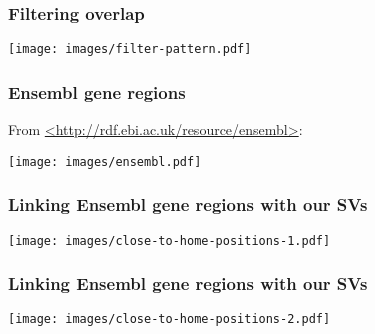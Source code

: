 \documentclass[11pt,aspectratio=169]{beamer} %
\begin{document}
\begin{frame}
  \frametitle{Filtering overlap}
  \begin{center}
    \texttt{[image: images/filter-pattern.pdf]}
  \end{center}
\end{frame}


\begin{frame}
  \frametitle{Ensembl gene regions}
  From \url{<http://rdf.ebi.ac.uk/resource/ensembl>}:
  \begin{center}
    \texttt{[image: images/ensembl.pdf]}
  \end{center}
\end{frame}

\begin{frame}
  \frametitle{Linking Ensembl gene regions with our SVs}
  \begin{center}
    \texttt{[image: images/close-to-home-positions-1.pdf]}
  \end{center}
\end{frame}

\begin{frame}
  \frametitle{Linking Ensembl gene regions with our SVs}
  \begin{center}
    \texttt{[image: images/close-to-home-positions-2.pdf]}
  \end{center}
\end{frame}


\end{document}
